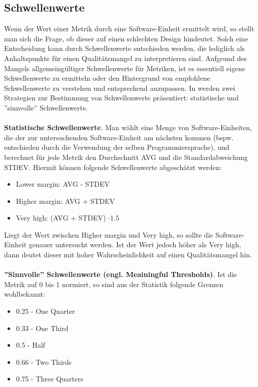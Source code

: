 \documentclass[12pt]{article}
\begin{document}
\subsection{Schwellenwerte}

Wenn der Wert einer Metrik durch eine Software-Einheit ermittelt
wird, so stellt man sich die Frage, ob dieser auf einen
schlechten Design hindeutet. Solch eine Entscheidung kann durch
Schwellenwerte entschieden werden, die lediglich als
Anhaltspunkte für einen Qualitätsmangel zu interpretieren sind.
Aufgrund des Mangels allgemeingültiger Schwellenwerte für
Metriken, ist es essentiell eigene Schwellenwerte zu ermitteln
oder den Hintergrund von empfohlene Schwellenwerte zu verstehen
und entsprechend anzupassen.
In \cite{Lan07} werden zwei Strategien zur Bestimmung von
Schwellenwerte präsentiert: statistische und ''sinnvolle''
Schwellenwerte.
\\
\\
\textbf{Statistische Schwellenwerte}. Man wählt eine Menge von
Software-Einheiten, die der zur untersuchenden Software-Einheit
am nächsten kommen (bspw. entschieden durch die Verwendung der selben
Programmiersprache), und berechnet für jede Metrik den
Durchschnitt AVG und die Standardabweichung STDEV. Hiermit können
folgende Schwellenwerte abgeschätzt werden:
\begin{itemize}
        \item Lower margin: AVG - STDEV
        \item Higher margin: AVG + STDEV
        \item Very high: (AVG + STDEV) $\cdot 1.5$
\end{itemize}
Liegt der Wert zwischen Higher margin und Very high, so sollte
die Software-Einheit genauer untersucht werden. Ist der Wert
jedoch höher als Very high, dann deutet dieser mit hoher
Wahrscheinlichkeit auf einen Qualitätsmangel hin.
\\
\\
\textbf{''Sinnvolle'' Schwellenwerte (engl. Meainingful
Thresholds)}.  Ist die Metrik auf 0 bis 1 normiert, so sind aus der
Statistik folgende Grenzen wohlbekannt:
\begin{itemize}
        \item 0.25 - One Quarter
        \item 0.33 - One Third 
        \item 0.5 - Half
        \item 0.66 - Two Thirds 
        \item 0.75 - Three Quarters 
\end{itemize}
\end{document}
